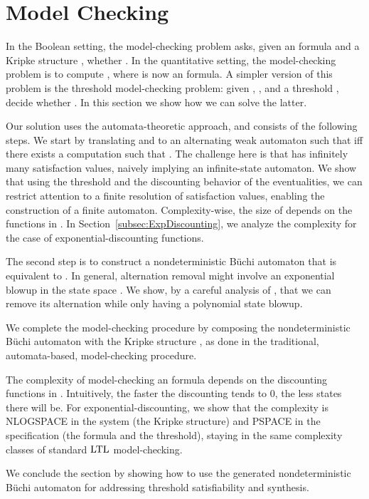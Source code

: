 \documentclass{llncs}
\newcommand{\LTL}{{\ensuremath{\rm LTL}}\xspace}
\begin{document}
\section{ Model Checking}
\label{sec:alg proc}
In the Boolean setting, the model-checking problem asks, given an  formula  and a Kripke structure , whether . In the quantitative setting, the model-checking problem is to compute , where  is now an  formula. A simpler version of this problem is the threshold model-checking problem: given , , and a threshold , decide whether . In this section we show how we can solve the latter.


Our solution uses the automata-theoretic approach, and consists of the following steps. We start by translating  and  to an alternating weak automaton  such that  iff there exists a computation  such that .
The challenge here is that  has infinitely many satisfaction values, naively implying an infinite-state automaton. We show that using the threshold and the discounting behavior of the eventualities, we can restrict attention to a finite resolution of satisfaction values, enabling the construction of a finite automaton.  Complexity-wise, the size of  depends on the functions in . In Section~\ref{subsec:ExpDiscounting}, we analyze the complexity for the case of exponential-discounting functions.

The second step is to construct a nondeterministic B\"uchi automaton  that is equivalent to . In general, alternation removal might involve an exponential blowup in the state space \cite{MH84}.
We show, by a careful analysis of , that we can remove its alternation while only having a polynomial state blowup.

We complete the model-checking procedure by composing the nondeterministic B\"uchi automaton  with the Kripke structure , as done in the traditional, automata-based, model-checking procedure.

The complexity of model-checking an  formula depends on the discounting functions in . Intuitively, the faster the discounting tends to 0, the less states there will be. For exponential-discounting, we show that the complexity is NLOGSPACE in the system (the Kripke structure) and PSPACE in the specification (the  formula and the threshold), staying in the same complexity classes of standard \LTL model-checking.

We conclude the section by showing how to use the generated nondeterministic B\"uchi automaton for 
addressing threshold satisfiability and synthesis.
\end{document}
